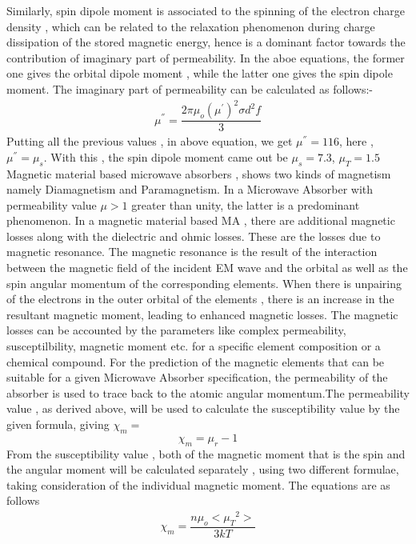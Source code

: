 \documentclass[journal]{IEEEtran}
\begin{document}
\begin{multicols}{2}
Similarly, spin dipole moment is associated to the spinning of the electron charge density , which can be related to the relaxation phenomenon during charge dissipation of the stored magnetic energy, hence is a dominant factor towards the contribution of imaginary part of permeability. In the aboe equations, the former one gives the orbital dipole moment , while the latter one gives the spin dipole moment.
The imaginary part of permeability can be calculated as follows:-
\begin{align}
\mu^{''} = \dfrac{2 \pi \mu_o (\mu^{'})^2 \sigma d^2 f}{3}
\end{align}
Putting all the previous values , in above equation, we get $\mu^{''} = 116$, here , $\mu^{''} = \mu_s $.
With this , the spin dipole moment came out be $\mu_s  = 7.3$, $\mu_T= 1.5$
Magnetic material based microwave absorbers , shows two kinds of magnetism namely Diamagnetism and Paramagnetism. In a Microwave Absorber with permeability value $\mu > 1$ greater than unity, the latter is a predominant phenomenon.
In a magnetic material based MA , there are additional magnetic losses along with the dielectric and ohmic losses. These are the losses due to magnetic resonance. The magnetic resonance is the result of the interaction between the magnetic field of the incident EM wave and the orbital as well as the spin angular momentum of the corresponding elements. When there is unpairing of the electrons in the outer orbital of the elements , there is an increase in the resultant magnetic moment, leading to enhanced magnetic losses. The magnetic losses can be accounted by the parameters like complex  permeability, susceptilbility, magnetic moment etc. for a specific element composition or a chemical compound.
For the prediction of the magnetic elements that can be suitable for a given Microwave Absorber specification, the permeability of the absorber is used to trace back to the atomic angular momentum.The permeability value , as derived above, will be used to calculate the susceptibility value by the given formula, giving $\chi_m = $
$$ \chi_m = \mu_r -1  $$
From  the susceptibility value , both of  the magnetic moment that is the spin and the angular moment will be calculated separately ,  using two different formulae, taking consideration of the individual magnetic moment. The equations are as follows
\begin{align}
\chi_m = \dfrac{n \mu_o {<{\mu_T}^2>}}{3kT} \\

\end{align}
\end{multicols}
\end{document}
